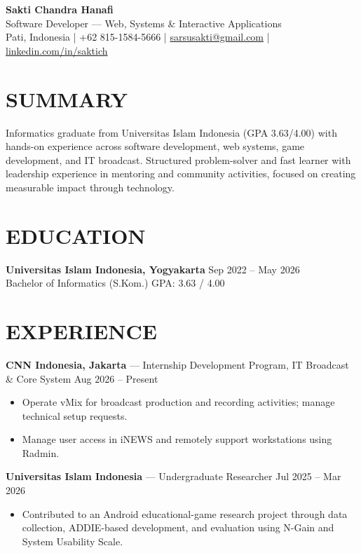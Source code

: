 \documentclass[a4paper,10pt]{article}
\begin{document}
\begin{center}
  {\fontsize{24}{28}\selectfont\textbf{Sakti Chandra Hanafi}}\\[3pt]
  Software Developer --- Web, Systems \& Interactive Applications\\[3pt]
  Pati, Indonesia \quad | \quad +62 815-1584-5666 \quad | \quad
  \href{mailto:sarsusakti@gmail.com}{sarsusakti@gmail.com} \quad | \quad
  \href{https://linkedin.com/in/saktich}{linkedin.com/in/saktich}
\end{center}

\section*{SUMMARY}
Informatics graduate from Universitas Islam Indonesia (GPA 3.63/4.00) with hands-on
experience across software development, web systems, game development, and IT broadcast.
Structured problem-solver and fast learner with leadership experience in mentoring and
community activities, focused on creating measurable impact through technology.

\section*{EDUCATION}
\textbf{Universitas Islam Indonesia, Yogyakarta} \hfill Sep 2022 -- May 2026\\
Bachelor of Informatics (S.Kom.) \hfill GPA: 3.63 / 4.00

\section*{EXPERIENCE}
\textbf{CNN Indonesia, Jakarta} --- Internship Development Program, IT Broadcast \& Core System
\hfill Aug 2026 -- Present
\begin{itemize}
  \item Operate vMix for broadcast production and recording activities; manage technical setup requests.
  \item Manage user access in iNEWS and remotely support workstations using Radmin.
\end{itemize}

\textbf{Universitas Islam Indonesia} --- Undergraduate Researcher
\hfill Jul 2025 -- Mar 2026
\begin{itemize}
  \item Contributed to an Android educational-game research project through data collection,
  ADDIE-based development, and evaluation using N-Gain and System Usability Scale.
\end{itemize}
\end{document}
